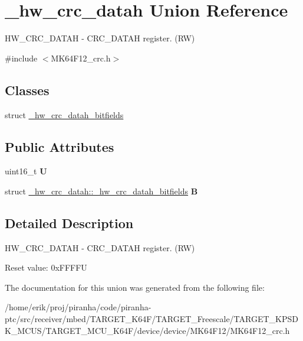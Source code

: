 \hypertarget{union__hw__crc__datah}{}\section{\+\_\+hw\+\_\+crc\+\_\+datah Union Reference}
\label{union__hw__crc__datah}


H\+W\+\_\+\+C\+R\+C\+\_\+\+D\+A\+T\+AH -\/ C\+R\+C\+\_\+\+D\+A\+T\+AH register. (RW)  




{\ttfamily \#include $<$M\+K64\+F12\+\_\+crc.\+h$>$}

\subsection*{Classes}
\begin{DoxyCompactItemize}
\item 
struct \hyperlink{struct__hw__crc__datah_1_1__hw__crc__datah__bitfields}{\+\_\+hw\+\_\+crc\+\_\+datah\+\_\+bitfields}
\end{DoxyCompactItemize}
\subsection*{Public Attributes}
\begin{DoxyCompactItemize}
\item 
uint16\+\_\+t {\bfseries U}\hypertarget{union__hw__crc__datah_ad77eb68f6c9bb9fc82ea905e77c4ea01}{}\label{union__hw__crc__datah_ad77eb68f6c9bb9fc82ea905e77c4ea01}

\item 
struct \hyperlink{struct__hw__crc__datah_1_1__hw__crc__datah__bitfields}{\+\_\+hw\+\_\+crc\+\_\+datah\+::\+\_\+hw\+\_\+crc\+\_\+datah\+\_\+bitfields} {\bfseries B}\hypertarget{union__hw__crc__datah_a56c88053768106a9ef618ad99b136dcb}{}\label{union__hw__crc__datah_a56c88053768106a9ef618ad99b136dcb}

\end{DoxyCompactItemize}


\subsection{Detailed Description}
H\+W\+\_\+\+C\+R\+C\+\_\+\+D\+A\+T\+AH -\/ C\+R\+C\+\_\+\+D\+A\+T\+AH register. (RW) 

Reset value\+: 0x\+F\+F\+F\+FU 

The documentation for this union was generated from the following file\+:\begin{DoxyCompactItemize}
\item 
/home/erik/proj/piranha/code/piranha-\/ptc/src/receiver/mbed/\+T\+A\+R\+G\+E\+T\+\_\+\+K64\+F/\+T\+A\+R\+G\+E\+T\+\_\+\+Freescale/\+T\+A\+R\+G\+E\+T\+\_\+\+K\+P\+S\+D\+K\+\_\+\+M\+C\+U\+S/\+T\+A\+R\+G\+E\+T\+\_\+\+M\+C\+U\+\_\+\+K64\+F/device/device/\+M\+K64\+F12/M\+K64\+F12\+\_\+crc.\+h\end{DoxyCompactItemize}
